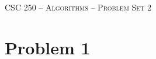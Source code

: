 \documentclass[11pt]{article}
\theoremstyle{nonumberplain}
\begin{document}



\begin{center}

{\LARGE
\textsc{CSC 250 -- Algorithms -- Problem Set 2}
\bigskip}

\bigskip
{\Large
}


\end{center}

\section*{Problem 1}

% 
\end{document}

